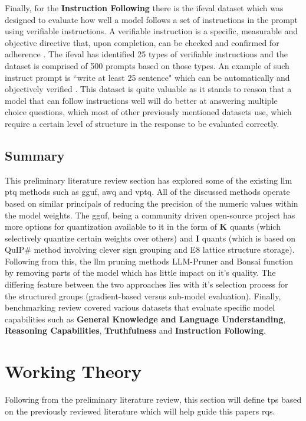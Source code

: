 \documentclass{ifacconf}
\begin{document}
	Finally, for the \textbf{Instruction Following} there is the \gls{ifeval} dataset which was designed to evaluate how well a model follows a set of instructions in the prompt using verifiable instructions. A verifiable instruction is a specific, measurable and objective directive that, upon completion, can be checked and confirmed for adherence \cite{zhou2023instructionfollowingevaluationlargelanguage}. The \gls{ifeval} has identified 25 types of verifiable instructions and the dataset is comprised of 500 prompts based on those types. An example of such instruct prompt is ``write at least 25 sentence" which can be automatically and objectively verified \cite{zhou2023instructionfollowingevaluationlargelanguage}. This dataset is quite valuable as it stands to reason that a model that can follow instructions well will do better at answering multiple choice questions, which most of other previously mentioned datasets use, which require a certain level of structure in the response to be evaluated correctly.
	
	\subsection{Summary}
	This preliminary literature review section has explored some of the existing \gls{llm} \gls{ptq} methods such as \gls{gguf}, \gls{awq} and \gls{vptq}. All of the discussed methods operate based on similar principals of reducing the precision of the numeric values within the model weights. The \gls{gguf}, being a community driven open-source project has more options for quantization available to it in the form of \textbf{K} quants (which selectively quantize certain weights over others) and \textbf{I} quants (which is based on QuIP\# method involving clever sign grouping and E8 lattice structure storage). Following from this, the \gls{llm} pruning methods LLM-Pruner and Bonsai function by removing parts of the model which has little impact on it's quality. The differing feature between the two approaches lies with it's selection process for the structured groups (gradient-based versus sub-model evaluation). Finally, benchmarking review covered various datasets that evaluate specific model capabilities such as \textbf{General Knowledge and Language Understanding}, \textbf{Reasoning Capabilities}, \textbf{Truthfulness} and \textbf{Instruction Following}. 
	
	\section{Working Theory}
	Following from the preliminary literature review, this section will define \glspl{tp} based on the previously reviewed literature which will help guide this papers \glspl{rq}.
	
\end{document}
